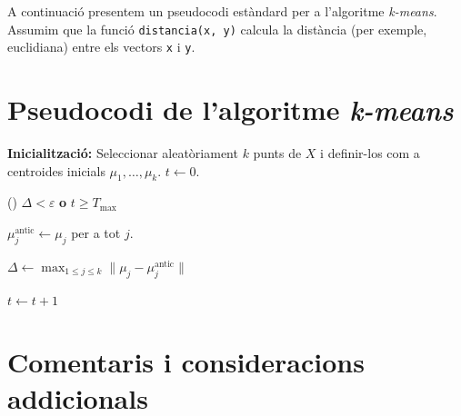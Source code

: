 \documentclass[a4paper,11pt]{article}
\begin{document}
A continuació presentem un pseudocodi estàndard per a l'algoritme
\textit{k-means}. Assumim que la funció
\texttt{distancia(x, y)} calcula la distància (per exemple, euclidiana)
entre els vectors \texttt{x} i \texttt{y}.

\section{Pseudocodi de l'algoritme \textit{k-means}}

\begin{algorithm}[H]
\DontPrintSemicolon
\caption{Algoritme \textit{k-means}}


\BlankLine
\textbf{Inicialització:}\;
Seleccionar aleatòriament $k$ punts de $X$ i definir-los com a centroides inicials $\mu_1,\dots,\mu_k$.\;
$t \leftarrow 0$.\;

\Repeat(){ $\Delta < \varepsilon$ \textbf{o} $t \ge T_{\max}$ }{

  \BlankLine

  \BlankLine
  $\mu_j^{\text{antic}} \leftarrow \mu_j$ per a tot $j$.\;

  \BlankLine

  \BlankLine
  $\Delta \leftarrow \max_{1 \le j \le k} \|\mu_j - \mu_j^{\text{antic}}\|$\;

  $t \leftarrow t + 1$\;

}

\;

\end{algorithm}

\section{Comentaris i consideracions addicionals}
\end{document}
